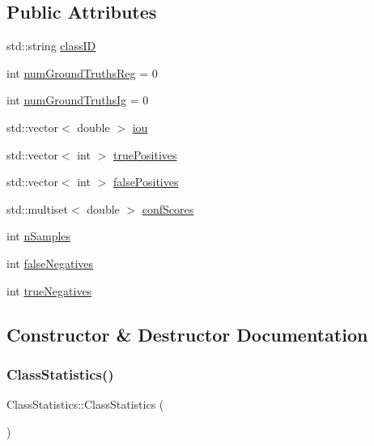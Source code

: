 \subsection*{Public Attributes}
\begin{DoxyCompactItemize}
\item 
std\+::string \hyperlink{struct_class_statistics_a4f06e2d800fde06ed4f6b77547d8dc06}{class\+ID}
\item 
int \hyperlink{struct_class_statistics_af869c91eda0b044c899797a3b10153ca}{num\+Ground\+Truths\+Reg} = 0
\item 
int \hyperlink{struct_class_statistics_a016df1ad61f150bb92d7d987488a4741}{num\+Ground\+Truths\+Ig} = 0
\item 
std\+::vector$<$ double $>$ \hyperlink{struct_class_statistics_ac0495687ef1d08720c41612afbf49730}{iou}
\item 
std\+::vector$<$ int $>$ \hyperlink{struct_class_statistics_a07e9de84d5cda8ee5b91d54f8d8685b1}{true\+Positives}
\item 
std\+::vector$<$ int $>$ \hyperlink{struct_class_statistics_a0193beb26acd9dab5f7a1709b50c353c}{false\+Positives}
\item 
std\+::multiset$<$ double $>$ \hyperlink{struct_class_statistics_a13f50f2fa57bf7de930955cd149667b6}{conf\+Scores}
\item 
int \hyperlink{struct_class_statistics_aa0b08fee8daa548214f4bcc3b2c5cc86}{n\+Samples}
\item 
int \hyperlink{struct_class_statistics_a5485816a475a6cc554c2d9e5b442c96d}{false\+Negatives}
\item 
int \hyperlink{struct_class_statistics_a8b268ca669e6d982c8ce409330cf08f9}{true\+Negatives}
\end{DoxyCompactItemize}


\subsection{Constructor \& Destructor Documentation}
\mbox{\label{struct_class_statistics_ac5a27388db5ca1d9283096020a9b1aeb}} 
\subsubsection{\texorpdfstring{Class\+Statistics()}{ClassStatistics()}\hspace{0.1cm}{\footnotesize\ttfamily [1/2]}}
{\footnotesize\ttfamily Class\+Statistics\+::\+Class\+Statistics (\begin{DoxyParamCaption}{ }\end{DoxyParamCaption})}

